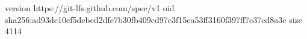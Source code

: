 version https://git-lfs.github.com/spec/v1
oid sha256:ad93dc10ef5debed2dfe7b30fb409cd97c3f15ea53ff3160f397ff7c37cd8a3c
size 4114
